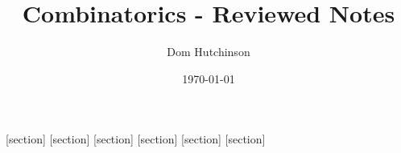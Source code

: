 \documentclass[11pt,a4paper]{article}
\begin{document}
\pagestyle{fancy}
\setlength\parindent{0pt}
\allowdisplaybreaks

[section]
[section]
[section]
[section]
[section]
[section]


\newcommand{\eg}{\textit{e.g.} }
\newcommand{\EG}{\underline{E.G.} - }
\newcommand{\ie}{\textit{i.e.} }
\newcommand{\IE}{\underline{I.E.} - }
\newcommand{\NB}{\underline{N.B.} - }
\newcommand{\nats}{\mathbb{N}}
\newcommand{\reals}{\mathbb{R}}
\newcommand{\binomial}[2]{{{#1}\choose{#2}}}
\newcommand{\Binomial}[2]{\displaystyle{{{#1}\choose{#2}}}}
\newcommand\doubleplus{+\kern-1.3ex+\kern0.8ex} %

\newcommand{\notation}[1]{\stepcounter{notation} \textbf{Notation \arabic{section}.\arabic{notation}\ - }\textit{#1}\\}
\newcommand{\proof}[1]{\stepcounter{proof} \textbf{Proof \arabic{section}.\arabic{proof}\ - }\textit{#1}\\}
\newcommand{\proposition}[1]{\stepcounter{proposition} \textbf{Proposition \arabic{section}.\arabic{proposition}\ - }\textit{#1}\\}
\newcommand{\Proposition}[1]{\stepcounter{proposition} \textbf{Proposition \arabic{section}.\arabic{proposition}\ - }\textit{#1}}
\newcommand{\theorem}[1]{\stepcounter{theorem} \textbf{Theorem \arabic{section}.\arabic{theorem}\ - }\textit{#1}\\}
\newcommand{\definition}[1]{\stepcounter{definition} \textbf{Definition \arabic{section}.\arabic{definition}\ - }\textit{#1}\\}
\newcommand{\example}[1]{\stepcounter{example} \textbf{Example \arabic{section}.\arabic{example}\ - }\textit{#1}\\}

\renewcommand{\headrulewidth}{0pt}

\title{Combinatorics - Reviewed Notes}
\author{Dom Hutchinson}
\date{\today}
\maketitle

\fancyhead[R]{\today}

\tableofcontents
\newpage
\end{document}
